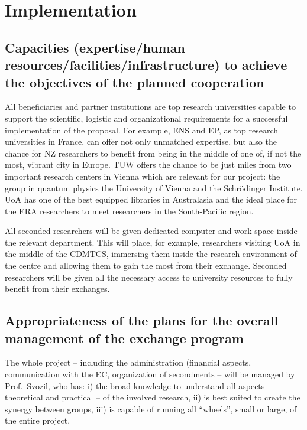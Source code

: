 \documentclass[12pt]{article}
\begin{document}
\section{Implementation}


\subsection{Capacities (expertise/human resources/\-facili\-ties/\-in\-fra\-struc\-ture) to achieve the objectives of the planned cooperation}
All beneficiaries and partner institutions are top research universities capable to support the scientific, logistic and organizational requirements for a successful implementation of the proposal. For example, ENS and EP, as top research universities in France, can offer not only unmatched expertise, but also the chance for NZ researchers to benefit from being in the middle of one of, if not the most, vibrant city in Europe. TUW  offers the chance to be just miles from two
important research centers in Vienna which are relevant for our project:
the group in quantum physics the University of Vienna and the Schr\" odinger Institute.
UoA has one of the best equipped
libraries in Australasia and the ideal place for the ERA researchers to meet researchers in the South-Pacific region.

All seconded researchers will be given dedicated computer and work space inside the relevant department. This will place, for example, researchers visiting UoA in the middle of the CDMTCS, immersing them inside the research environment of the centre and allowing them to gain the most from their exchange. Seconded researchers will be given all the necessary access to university resources to fully benefit from their exchanges.



\subsection{Appropriateness of the plans for the overall management of the exchange program}

The whole project -- including the administration (financial aspects, communication  with the EC, organization of secondments -- will be managed by Prof.\  Svozil, who has: i)  the broad knowledge to understand all aspects -- theoretical and practical -- of the involved research, ii) is best suited to create the synergy between groups, iii) is capable of running all ``wheels'', small or large, of the entire project.
\end{document}

